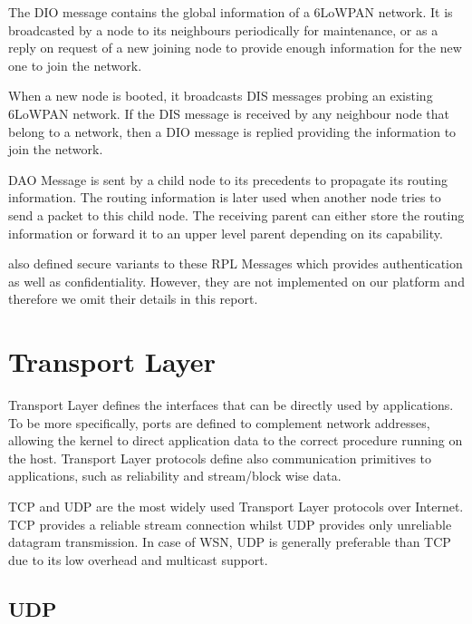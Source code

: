 \begin{description}[style=nextline]
	\begin{description}[style=nextline]
		\item[\textbf{DAG Information Object (DIO) Message}]
		The DIO message contains the global information of a 6LoWPAN network. It is broadcasted by a node to its neighbours periodically for maintenance, or as a reply on request of a new joining node to provide enough information for the new one to join the network.
		\item[\textbf{DAG Information Solicitation (DIS) Message}]
		When a new node is booted, it broadcasts DIS messages probing an existing 6LoWPAN network. If the DIS message is received by any neighbour node that belong to a network, then a DIO message is replied providing the information to join the network.
		\item[\textbf{Destination Advertisement Object (DAO) Message}]
		DAO Message is sent by a child node to its precedents to propagate its routing information. The routing information is later used when another node tries to send a packet to this child node. The receiving parent can either store the routing information or forward it to an upper level parent depending on its capability.
	\end{description}
	
	\cite{rfc6550} also defined secure variants to these RPL Messages which provides authentication as well as confidentiality. However, they are not implemented on our platform and therefore we omit their details in this report.
\end{description}

\section{Transport Layer} \label{Sec: Transport Layer}
Transport Layer defines the interfaces that can be directly used by applications. To be more specifically, ports are defined to complement network addresses, allowing the kernel to direct application data to the correct procedure running on the host. Transport Layer protocols define also communication primitives to applications, such as reliability and stream/block wise data.

TCP and UDP are the most widely used Transport Layer protocols over Internet. TCP provides a reliable stream connection whilst UDP provides only unreliable datagram transmission. In case of WSN, UDP is generally preferable than TCP due to its low overhead and multicast support.

\subsection{UDP}

